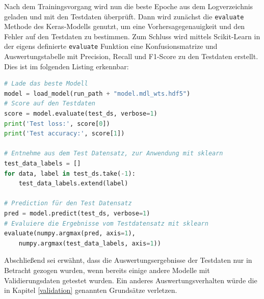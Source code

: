 \documentclass[11pt,bibliography=totocnumbered]{scrartcl}
\begin{document}
Nach dem Trainingsvorgang wird nun die beste Epoche aus dem Logverzeichnis geladen und mit den Testdaten überprüft. Dann wird zunächst die \lstinline[language=pythoninline]|evaluate| Methode des Keras-Modells genutzt, um eine Vorhersagegenauigkeit und den Fehler auf den Testdaten zu bestimmen. Zum Schluss wird mittels Scikit-Learn in der eigens definierte \lstinline[language=pythoninline]|evaluate| Funktion eine Konfusionsmatrize und Auswertungstabelle mit Precision, Recall und F1-Score zu den Testdaten erstellt. Dies ist im folgenden Listing erkennbar:
\begin{lstlisting}[language=python,firstnumber=1,caption={Auswertung eines Modells mit Testdaten},label=lst:modell_eval]
# Lade das beste Modell
model = load_model(run_path + "model.mdl_wts.hdf5")
# Score auf den Testdaten
score = model.evaluate(test_ds, verbose=1)
print('Test loss:', score[0])
print('Test accuracy:', score[1])

# Entnehme aus dem Test Datensatz, zur Anwendung mit sklearn
test_data_labels = []
for data, label in test_ds.take(-1):
	test_data_labels.extend(label)

# Prediction für den Test Datensatz
pred = model.predict(test_ds, verbose=1)
# Evaluiere die Ergebnisse vom Testdatensatz mit sklearn
evaluate(numpy.argmax(pred, axis=1), 
	numpy.argmax(test_data_labels, axis=1))
\end{lstlisting}
Abschließend sei erwähnt, dass die Auswertungsergebnisse der Testdaten nur in Betracht gezogen wurden, wenn bereits einige andere Modelle mit Validierungsdaten getestet wurden. Ein anderes Auswertungsverhalten würde die in Kapitel \ref{validation} genannten Grundsätze verletzen.
\end{document}
